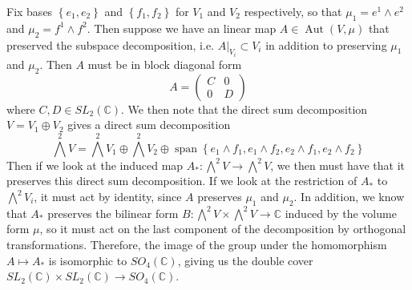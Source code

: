\documentclass[psamsfonts]{amsart}
\theoremstyle{definition}
\theoremstyle{remark}
\newcommand{\C}{\mathbb{C}}
\newcommand{\set}[1]{\left\lbrace #1 \right\rbrace}
\DeclareMathOperator{\Aut}{Aut}
\DeclareMathOperator{\spn}{span}
\begin{document}
Fix bases $\set{e_1,e_2}$ and $\set{f_1,f_2}$ for $V_1$ and $V_2$ respectively, so that $\mu_1 = e^1 \wedge e^2$ and $\mu_2 = f^1 \wedge f^2$. Then suppose we have an linear map $A \in \Aut(V, \mu)$ that preserved the subspace decomposition, i.e. $A\vert_{V_i} \subset V_i$ in addition to preserving $\mu_1$ and $\mu_2$. Then $A$ must be in block diagonal form
$$A = \begin{pmatrix}
C & 0 \\
0 & D
\end{pmatrix} $$
where $C,D \in SL_2(\C)$. We then note that the direct sum decomposition $V = V_1 \oplus V_2$ gives a direct sum decomposition
$$\bigwedge^2V = \bigwedge^2V_1 \oplus \bigwedge^2V_2 \oplus \spn \set{e_1 \wedge f_1, e_1 \wedge f_2, e_2 \wedge f_1, e_2 \wedge f_2} $$
Then if we look at the induced map $A_* : \bigwedge^2 V \to \bigwedge^2V$, we then must have that it preserves this direct sum decomposition. If we look at the restriction of $A_*$ to $\bigwedge^2V_i$, it must act by identity, since $A$ preserves $\mu_1$ and $\mu_2$. In addition, we know that $A_*$ preserves the bilinear form $B : \bigwedge^2V \times \bigwedge^2V \to \C$ induced by the volume form $\mu$, so it must act on the last component of the decomposition by orthogonal transformations. Therefore, the image of the group under the homomorphism $A \mapsto A_*$ is isomorphic to $SO_4(\C)$, giving us the double cover $SL_2(\C) \times SL_2(\C) \to SO_4(\C)$.
%
\setcounter{section}{12}
\setcounter{thm}{0}
%
\end{document}
